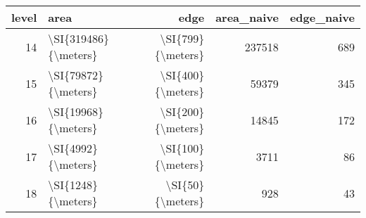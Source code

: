 \begin{tabular}{rlrrr}
\toprule
 level &                 area &              edge &  area\_naive &  edge\_naive \\
\midrule
    14 & \textbackslash SI\{319486\}\{\textbackslash meters\} & \textbackslash SI\{799\}\{\textbackslash meters\} &      237518 &         689 \\
    15 &  \textbackslash SI\{79872\}\{\textbackslash meters\} & \textbackslash SI\{400\}\{\textbackslash meters\} &       59379 &         345 \\
    16 &  \textbackslash SI\{19968\}\{\textbackslash meters\} & \textbackslash SI\{200\}\{\textbackslash meters\} &       14845 &         172 \\
    17 &   \textbackslash SI\{4992\}\{\textbackslash meters\} & \textbackslash SI\{100\}\{\textbackslash meters\} &        3711 &          86 \\
    18 &   \textbackslash SI\{1248\}\{\textbackslash meters\} &  \textbackslash SI\{50\}\{\textbackslash meters\} &         928 &          43 \\
\bottomrule
\end{tabular}
